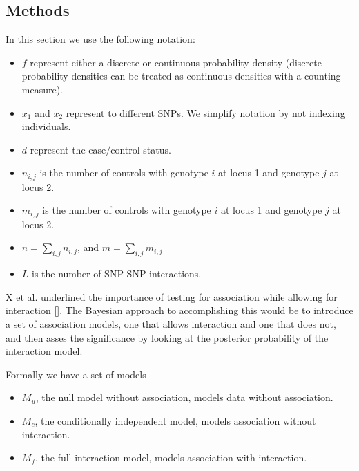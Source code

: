 \documentclass{bioinfo}
\begin{document}
\begin{methods}
\section{Methods}
In this section we use the following notation:
\begin{itemize}
\item $f$ represent either a discrete or continuous probability density (discrete probability densities can be treated as continuous densities with a counting measure).
\item $x_1$ and $x_2$ represent to different SNPs. We simplify notation by not indexing individuals.
\item $d$ represent the case/control status.
\item $n_{i,j}$ is the number of controls with genotype $i$ at locus 1 and genotype $j$ at locus 2.
\item $m_{i,j}$ is the number of controls with genotype $i$ at locus 1 and genotype $j$ at locus 2.
\item $n = \sum_{i,j} n_{i,j}$, and $m = \sum_{i,j} m_{i,j}$
\item $L$ is the number of SNP-SNP interactions.
\end{itemize}

X et al. underlined the importance of testing for association while allowing for interaction []. The Bayesian approach to accomplishing this would be to introduce a set of association models, one that allows interaction and one that does not, and then asses the significance by looking at the posterior probability of the interaction model.

Formally we have a set of models
\begin{itemize}
\item $M_u$, the null model without association, models data without association.
\item $M_c$, the conditionally independent model, models association without interaction.
\item $M_f$, the full interaction model, models association with interaction.
\end{itemize}


\end{methods}
\end{document}
